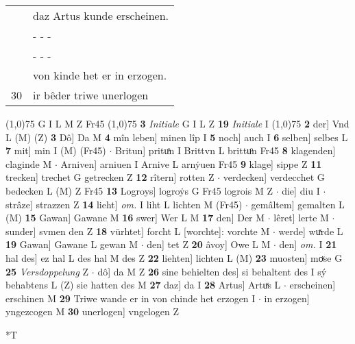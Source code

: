 \documentclass[8pt,a4paper,notitlepage]{article}
\begin{document}
\begin{table}[ht]
\begin{minipage}[t]{0.5\linewidth}
\begin{tabular}{rl}
 & daz Artus kunde erscheinen.\\ 
 & \multicolumn{1}{l}{ - - - }\\ 
 & \multicolumn{1}{l}{ - - - }\\ 
 & von kinde het er in erzogen.\\ 
30 & ir bêder triwe unerlogen\\ 
\end{tabular}
\scriptsize
\line(1,0){75} \newline
G I L M Z Fr45 \newline
\line(1,0){75} \newline
\textbf{3} \textit{Initiale} G I L Z  \textbf{19} \textit{Initiale} I  \newline
\line(1,0){75} \newline
\textbf{2} der] Vnd L (M) (Z) \textbf{3} Dô] Da M \textbf{4} mîn leben] minen lîp I \textbf{5} noch] auch I \textbf{6} selben] selbes L \textbf{7} mit] min I (M) (Fr45)  $\cdot$ Britun] prituͦn I Brittvn L brittuͦn Fr45 \textbf{8} klagenden] claginde M  $\cdot$ Arniven] arniuen I Arnive L arnẏuen Fr45 \textbf{9} klage] sippe Z \textbf{11} trecken] trechet G getrecken Z \textbf{12} rîtern] rotten Z  $\cdot$ verdecken] verdecchet G bedecken L (M) Z Fr45 \textbf{13} Logroys] logroẏs G Fr45 logrois M Z  $\cdot$ die] diu I  $\cdot$ strâze] strazzen Z \textbf{14} lieht] \textit{om.} I liht L lichten M (Fr45)  $\cdot$ gemâltem] gemalten L (M) \textbf{15} Gawan] Gawane M \textbf{16} swer] Wer L M \textbf{17} den] Der M  $\cdot$ lêret] lerte M  $\cdot$ sunder] svmen den Z \textbf{18} vürhtet] forcht L [worchte]: vorchte M  $\cdot$ werde] wuͯrde L \textbf{19} Gawan] Gawane L gewan M  $\cdot$ den] tet Z \textbf{20} âvoy] Owe L M  $\cdot$ den] \textit{om.} I \textbf{21} hal des] ez hal L des hal M des Z \textbf{22} liehten] lichten L (M) \textbf{23} muosten] moͮse G \textbf{25} \textit{Versdoppelung} Z   $\cdot$ dô] da M Z \textbf{26} sine behielten des] si behaltent des I sý behabtens L (Z) sie hatten des M \textbf{27} daz] da I \textbf{28} Artus] Artuͯs L  $\cdot$ erscheinen] erschinen M \textbf{29} Triwe wande er in von chinde het erzogen I  $\cdot$ in erzogen] yngezcogen M \textbf{30} unerlogen] vngelogen Z \newline
\end{minipage}
\hspace{0.5cm}
\begin{minipage}[t]{0.5\linewidth}
\small
\begin{center}*T
\end{center}
\begin{tabular}{rl}

\end{tabular}
\end{minipage}
\end{table}
\end{document}
